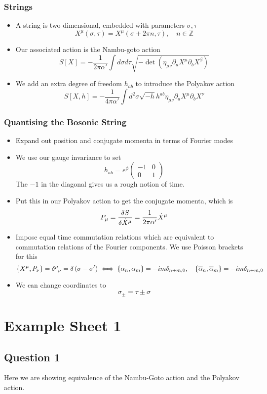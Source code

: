\documentclass[11pt, oneside]{article}   	%
\theoremstyle{slanted}
\begin{document}
\subsubsection*{Strings}
\begin{itemize}
	\item A string is two dimensional, 
		embedded with parameters $ \sigma, \tau $
		\[
			X^ \mu  \left( \sigma, \tau  \right)   = X^ \mu 
			\left(  \sigma + 2 \pi n , \tau  \right) , \quad 
			n \in \mathbb{ Z } 
		\]
	\item Our associated action is the Nambu-goto action 
	\[
		S[X] =  - \frac{1}{ 2 \pi \alpha ' }\int d \sigma d \tau 
		\sqrt{  - \det\left( \eta_{ \mu \nu } 
		\partial  _ a X ^ \mu \partial  _ b X ^ \beta \right) } 
	\] 
\item We add an extra degree of freedom $ h _{ ab } $ to introduce 
	the Polyakov action 
	\[
	 S[X, h ] = - \frac{1}{4 \pi \alpha ' } 
	 \int d ^ 2 \sigma \sqrt{  - h }  h ^{ ab } \eta _{ \mu \nu } 
	 \partial  _ a X ^ \mu \partial  _ b X ^ \nu 
	\]  
\end{itemize}


\subsubsection*{Quantising the Bosonic String}

\begin{itemize}
	\item Expand out position and conjugate 
		momenta in terms of Fourier modes
	\item We use our gauge invariance to 
		set 
		\[
			h_{ ab }  = e ^{ \phi } \begin{pmatrix}  - 1 &  0 
			\\ 0 & 1 \end{pmatrix} 
		\] The $ - 1 $ in the diagonal gives us a rough notion 
		of time. 
	\item Put this in our Polyakov action to get the 
		conjugate momenta, which is 
		\[
			P_\mu  = \fdv{S}{\dot{ X } ^ \mu  }
			 = \frac{1}{2 \pi \alpha '  } \dot{ X } ^ \mu  
		\]  
	\item Impose equal time commutation relations 
		which are equivalent to commutation 
		relations of the Fourier components. We use Poisson 
		brackets for this
		\[
		 \left\{ X ^ \mu, P_ \nu  \right\}  = 
		 \delta \indices{ ^ \mu _ \nu }  = \delta \left( \sigma  - \sigma '  \right) \iff \left\{ \alpha_ n , \alpha_ m  \right\}   = 
	 - i m \delta_{ n + m , 0 } , \quad \left\{  \overline{ \alpha }_ n, 
 \overline{ \alpha } _ m  \right\}   = - i m \delta _{ n + m , 0  } \]
	
	\item We can change coordinates to 
		\[
		 \sigma_{ \pm }  = \tau \pm \sigma 
		\] 
\end{itemize}
\section*{Example Sheet 1}

\subsection{Question 1}
Here we are showing equivalence 
of the Nambu-Goto action and the Polyakov action. 
\end{document}

